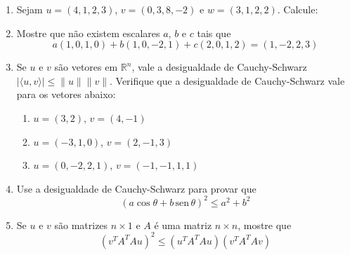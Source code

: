 \documentclass[a4paper,5pt]{amsbook}
\newcommand{\sen}{\,\mbox{sen}\,}
\newcommand{\ds}{\displaystyle}
\begin{document}
\vspace{1cm}
\begin{enumerate}
	\vspace{0.5cm}
	\item Sejam $u = (4,1,2,3)$, $v = (0,3,8,-2)$ e $w = (3,1,2,2)$. Calcule:


	\vspace{0.5cm}
	\item Mostre que n\~ao existem escalares $a$, $b$ e $c$ tais que
		\[a(1,0,1,0)+b(1,0,-2,1)+c(2,0,1,2)=(1,-2,2,3)\]

	\vspace{0.5cm}
	\item Se $u$ e $v$ s\~ao vetores em $\mathbb{R}^n$, vale a desigualdade de
		Cauchy-Schwarz $|\langle u, v \rangle| \le \|u\| \|v\|$. Verifique que
		a desigualdade de Cauchy-Schwarz vale para os vetores abaixo:
		\begin{enumerate}
			\item $u = (3,2)$, $v = (4, -1)$
			\item $u = (-3,1,0)$, $v = (2,-1,3)$
			\item $u = (0,-2,2,1)$, $v = (-1,-1,1,1)$
		\end{enumerate}

	\vspace{0.5cm}
	\item Use a desigualdade de Cauchy-Schwarz para provar que
		\[{(a \cos\theta + b \sen\theta)}^2 \le a^2 + b^2\]

	\vspace{0.5cm}
	\item Se $u$ e $v$ s\~ao matrizes $n \times 1$ e $A$ \'e uma matriz $n \times
		n$, mostre que
		\[{\left(v^TA^TAu\right)}^2 \le \left(u^TA^TAu\right)\left(v^TA^TAv\right)\]
\end{enumerate}
\end{document}
